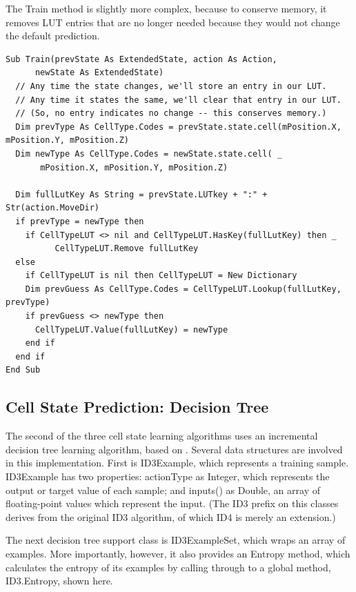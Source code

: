\documentclass{article}
\begin{document}
The Train method is slightly more complex, because to conserve memory, it removes LUT entries that are no longer needed because they would not change the default prediction.

\begin{lstlisting}
Sub Train(prevState As ExtendedState, action As Action,
      newState As ExtendedState)
  // Any time the state changes, we'll store an entry in our LUT.
  // Any time it states the same, we'll clear that entry in our LUT.
  // (So, no entry indicates no change -- this conserves memory.)
  Dim prevType As CellType.Codes = prevState.state.cell(mPosition.X, mPosition.Y, mPosition.Z)
  Dim newType As CellType.Codes = newState.state.cell( _
       mPosition.X, mPosition.Y, mPosition.Z)
  
  Dim fullLutKey As String = prevState.LUTkey + ":" + Str(action.MoveDir)
  if prevType = newType then
    if CellTypeLUT <> nil and CellTypeLUT.HasKey(fullLutKey) then _
          CellTypeLUT.Remove fullLutKey
  else
    if CellTypeLUT is nil then CellTypeLUT = New Dictionary
    Dim prevGuess As CellType.Codes = CellTypeLUT.Lookup(fullLutKey, prevType)
    if prevGuess <> newType then
      CellTypeLUT.Value(fullLutKey) = newType
    end if
  end if
End Sub
\end{lstlisting}

\subsection{Cell State Prediction: Decision Tree}

The second of the three cell state learning algorithms uses an incremental decision tree learning algorithm, based on \cite{AIFORGAMES}.  Several data structures are involved in this implementation.  First is ID3Example, which represents a training sample.  ID3Example has two properties: actionType as Integer, which represents the output or target value of each sample; and inputs() as Double, an array of floating-point values which represent the input.  (The ID3 prefix on this classes derives from the original ID3 algorithm, of which ID4 is merely an extension.)

The next decision tree support class is ID3ExampleSet, which wraps an array of examples.  More importantly, however, it also provides an Entropy method, which calculates the entropy of its examples by calling through to a global method, ID3.Entropy, shown here.
\end{document}
